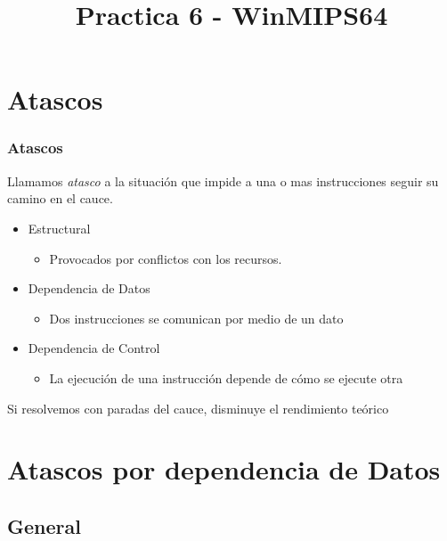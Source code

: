 \documentclass{beamer}
\title{Practica 6 - WinMIPS64}
\begin{document}
\section{Atascos}


\begin{frame}
\frametitle{Atascos}
Llamamos \emph{atasco} a la situación que impide a una o mas instrucciones seguir su camino en el cauce.

\begin{itemize}
\item Estructural
\begin{itemize}
\item Provocados por conflictos con los recursos.
\end{itemize}


\item Dependencia de Datos
\begin{itemize}
\item Dos instrucciones se comunican por medio de un dato
\end{itemize}

\item Dependencia de Control
\begin{itemize}
\item La ejecución de una instrucción depende de cómo se ejecute otra
\end{itemize}

\end{itemize}
Si resolvemos con paradas del cauce, disminuye el rendimiento teórico
\end{frame}

\section{Atascos por dependencia de Datos}
\subsection{General}
\end{document}
